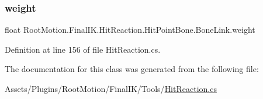 \subsubsection{\texorpdfstring{weight}{weight}}
{\footnotesize\ttfamily float Root\+Motion.\+Final\+I\+K.\+Hit\+Reaction.\+Hit\+Point\+Bone.\+Bone\+Link.\+weight}



Definition at line 156 of file Hit\+Reaction.\+cs.



The documentation for this class was generated from the following file\+:\begin{DoxyCompactItemize}
\item 
Assets/\+Plugins/\+Root\+Motion/\+Final\+I\+K/\+Tools/\mbox{\hyperlink{_hit_reaction_8cs}{Hit\+Reaction.\+cs}}\end{DoxyCompactItemize}
